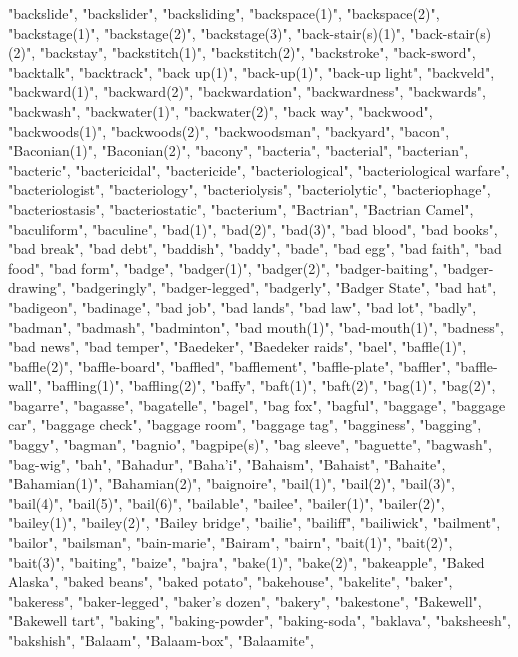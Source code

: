 "backslide",
"backslider",
"backsliding",
"backspace(1)",
"backspace(2)",
"backstage(1)",
"backstage(2)",
"backstage(3)",
"back-stair(s)(1)",
"back-stair(s)(2)",
"backstay",
"backstitch(1)",
"backstitch(2)",
"backstroke",
"back-sword",
"backtalk",
"backtrack",
"back up(1)",
"back-up(1)",
"back-up light",
"backveld",
"backward(1)",
"backward(2)",
"backwardation",
"backwardness",
"backwards",
"backwash",
"backwater(1)",
"backwater(2)",
"back way",
"backwood",
"backwoods(1)",
"backwoods(2)",
"backwoodsman",
"backyard",
"bacon",
"Baconian(1)",
"Baconian(2)",
"bacony",
"bacteria",
"bacterial",
"bacterian",
"bacteric",
"bactericidal",
"bactericide",
"bacteriological",
"bacteriological warfare",
"bacteriologist",
"bacteriology",
"bacteriolysis",
"bacteriolytic",
"bacteriophage",
"bacteriostasis",
"bacteriostatic",
"bacterium",
"Bactrian",
"Bactrian Camel",
"baculiform",
"baculine",
"bad(1)",
"bad(2)",
"bad(3)",
"bad blood",
"bad books",
"bad break",
"bad debt",
"baddish",
"baddy",
"bade",
"bad egg",
"bad faith",
"bad food",
"bad form",
"badge",
"badger(1)",
"badger(2)",
"badger-baiting",
"badger-drawing",
"badgeringly",
"badger-legged",
"badgerly",
"Badger State",
"bad hat",
"badigeon",
"badinage",
"bad job",
"bad lands",
"bad law",
"bad lot",
"badly",
"badman",
"badmash",
"badminton",
"bad mouth(1)",
"bad-mouth(1)",
"badness",
"bad news",
"bad temper",
"Baedeker",
"Baedeker raids",
"bael",
"baffle(1)",
"baffle(2)",
"baffle-board",
"baffled",
"bafflement",
"baffle-plate",
"baffler",
"baffle-wall",
"baffling(1)",
"baffling(2)",
"baffy",
"baft(1)",
"baft(2)",
"bag(1)",
"bag(2)",
"bagarre",
"bagasse",
"bagatelle",
"bagel",
"bag fox",
"bagful",
"baggage",
"baggage car",
"baggage check",
"baggage room",
"baggage tag",
"bagginess",
"bagging",
"baggy",
"bagman",
"bagnio",
"bagpipe(s)",
"bag sleeve",
"baguette",
"bagwash",
"bag-wig",
"bah",
"Bahadur",
"Baha'i",
"Bahaism",
"Bahaist",
"Bahaite",
"Bahamian(1)",
"Bahamian(2)",
"baignoire",
"bail(1)",
"bail(2)",
"bail(3)",
"bail(4)",
"bail(5)",
"bail(6)",
"bailable",
"bailee",
"bailer(1)",
"bailer(2)",
"bailey(1)",
"bailey(2)",
"Bailey bridge",
"bailie",
"bailiff",
"bailiwick",
"bailment",
"bailor",
"bailsman",
"bain-marie",
"Bairam",
"bairn",
"bait(1)",
"bait(2)",
"bait(3)",
"baiting",
"baize",
"bajra",
"bake(1)",
"bake(2)",
"bakeapple",
"Baked Alaska",
"baked beans",
"baked potato",
"bakehouse",
"bakelite",
"baker",
"bakeress",
"baker-legged",
"baker's dozen",
"bakery",
"bakestone",
"Bakewell",
"Bakewell tart",
"baking",
"baking-powder",
"baking-soda",
"baklava",
"baksheesh",
"bakshish",
"Balaam",
"Balaam-box",
"Balaamite",
